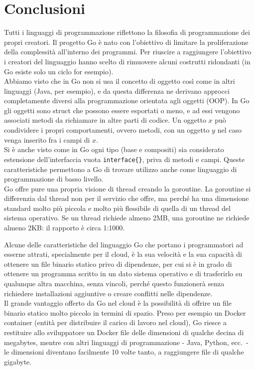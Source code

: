 \documentclass[../thesis.tex]{subfiles}
\begin{document}
    \newpage
    \section*{Conclusioni}
    Tutti i linguaggi di programmazione riflettono la filosofia di programmazione dei propri creatori.
    Il progetto Go è nato con l'obiettivo di limitare la proliferazione della complessità all'interno dei programmi.
    Per riuscire a raggiungere l'obiettivo i creatori del linguaggio hanno scelto di rimuovere alcuni costrutti ridondanti (in Go esiste solo un ciclo for esempio). \\
    Abbiamo visto che in Go non si usa il concetto di oggetto così come in altri linguaggi (Java, per esempio), e da questa differenza ne derivano approcci completamente diversi alla programmazione orientata agli oggetti (OOP).
    In Go gli oggetti sono struct che possono essere esportati o meno, e ad essi vengono associati metodi da richiamare in altre parti di codice.
    Un oggetto $x$ può condividere i propri comportamenti, ovvero metodi, con un oggetto $y$ nel caso venga inserito fra i campi di $x$. \\
    Si è anche visto come in Go ogni tipo (base e compositi) sia considerato estensione dell'interfaccia vuota \verb"interface{}", priva di metodi e campi.
    Queste caratteristiche permettono a Go di trovare utilizzo anche come linguaggio di programmazione di basso livello. \\
    Go offre pure una propria visione di thread creando la goroutine.
    La goroutine si differenzia dal thread non per il servizio che offre, ma perché ha una dimensione standard molto più piccola e molto più flessibile di quella di un thread del sistema operativo.
    Se un thread richiede almeno 2MB, una goroutine ne richiede almeno 2KB: il rapporto è circa 1:1000.
    \hfill \vspace{12pt}

    Alcune delle caratteristiche del linguaggio Go che portano i programmatori ad esserne attrati, specialmente per il cloud, è la sua velocità e la sua capacità di ottenere un file binario statico privo di dipendenze, per cui si è in grado di ottenere un programma scritto in un dato sistema operativo e di trasferirlo su qualunque altra macchina, senza vincoli, perché questo funzionerà senza richiedere installazioni aggiuntive o creare conflitti nelle dipendenze. \\
    Il grande vantaggio offerto da Go nel cloud è la possibilità di offrire un file binario statico molto piccolo in termini di spazio.
    Preso per esempio un Docker container (entità per distribuire il carico di lavoro nel cloud), Go riesce a restituire allo sviluppatore un Docker file delle dimensioni di qualche decina di megabytes, mentre con altri linguaggi di programmazione - Java, Python, ecc.\ - le dimensioni diventano facilmente 10 volte tanto, a raggiungere file di qualche gigabyte.
    \hfill \vspace{12pt}
\end{document}
